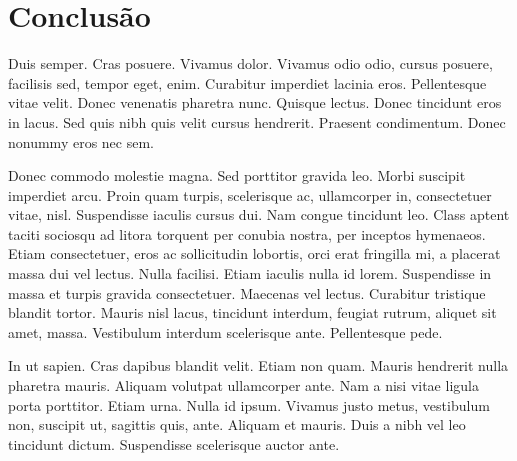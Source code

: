 
\chapter{Conclusão}

Duis semper. Cras posuere. Vivamus dolor. Vivamus odio odio, cursus posuere, facilisis sed, tempor eget, enim. Curabitur imperdiet lacinia eros. Pellentesque vitae velit. Donec venenatis pharetra nunc. Quisque lectus. Donec tincidunt eros in lacus. Sed quis nibh quis velit cursus hendrerit. Praesent condimentum. Donec nonummy eros nec sem.

Donec commodo molestie magna. Sed porttitor gravida leo. Morbi suscipit imperdiet arcu. Proin quam turpis, scelerisque ac, ullamcorper in, consectetuer vitae, nisl. Suspendisse iaculis cursus dui. Nam congue tincidunt leo. Class aptent taciti sociosqu ad litora torquent per conubia nostra, per inceptos hymenaeos. Etiam consectetuer, eros ac sollicitudin lobortis, orci erat fringilla mi, a placerat massa dui vel lectus. Nulla facilisi. Etiam iaculis nulla id lorem. Suspendisse in massa et turpis gravida consectetuer. Maecenas vel lectus. Curabitur tristique blandit tortor. Mauris nisl lacus, tincidunt interdum, feugiat rutrum, aliquet sit amet, massa. Vestibulum interdum scelerisque ante. Pellentesque pede.

In ut sapien. Cras dapibus blandit velit. Etiam non quam. Mauris hendrerit nulla pharetra mauris. Aliquam volutpat ullamcorper ante. Nam a nisi vitae ligula porta porttitor. Etiam urna. Nulla id ipsum. Vivamus justo metus, vestibulum non, suscipit ut, sagittis quis, ante. Aliquam et mauris. Duis a nibh vel leo tincidunt dictum. Suspendisse scelerisque auctor ante.
